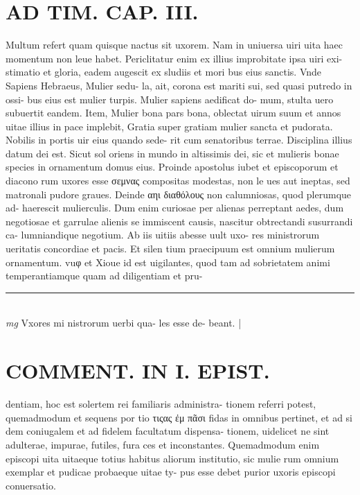 \documentclass{article}
\begin{document}
\begin{pages}
\section*{AD TIM. CAP. III. }
\marginpar{[ p.132 ]}\pstart Multum refert quam quisque nactus sit uxorem. Nam in uniuersa uiri uita haec momentum non leue habet. Periclitatur enim ex illius improbitate ipsa uiri exi- stimatio et gloria, eadem augescit ex sludiis et mori bus eius sanctis. Vnde Sapiens Hebraeus, Mulier sedu- la, ait, corona est mariti sui, sed quasi putredo in ossi- bus eius est mulier turpis. Mulier sapiens aedificat do- mum, stulta uero subuertit eandem. Item, Mulier bona pars bona, oblectat uirum suum et annos uitae illius in pace implebit, Gratia super gratiam mulier sancta et pudorata. Nobilis in portis uir eius quando sede- rit cum senatoribus terrae. Disciplina illius datum dei est. Sicut sol oriens in mundo in altissimis dei, sic et mulieris bonae species in ornamentum domus eius. Proinde apostolus iubet et episcoporum et diacono rum uxores esse σεμνας compositas modestas, non le ues aut ineptas, sed matronali pudore graues. Deinde αηι διαθόλους non calumniosas, quod plerumque ad- haerescit mulierculis. Dum enim curiosae per alienas perreptant aedes, dum negotiosae et garrulae alienis se immiscent causis, nascitur obtrectandi susurrandi ca- lumniandique negotium. Ab iis uitiis abesse uult uxo- res ministrorum ueritatis concordiae et pacis. Et silen tium praecipuum est omnium mulierum ornamentum. vuφ et Xioue id est uigilantes, quod tam ad sobrietatem animi temperantiamque quam ad diligentiam et pru-  \pend
\vspace{0.5cm}\noindent
\vspace{0.2cm}\rule{1cm}{0.2pt}\\ 
\hspace{0.2cm}\textit{mg}
\footnotesize Vxores mi nistrorum uerbi qua- les esse de- beant. 
\normalsize| 
\section*{COMMENT. IN I. EPIST. }\pstart dentiam, hoc est solertem rei familiaris administra- tionem referri potest, quemadmodum et sequens por tio τιςας ἐμ πᾶσι fidas in omnibus pertinet, et ad si dem coniugalem et ad fidelem facultatum dispensa- tionem, uidelicet ne sint adulterae, impurae, futiles, fura ces et inconstantes. Quemadmodum enim episcopi uita uitaeque totius habitus aliorum institutio, sic mulie rum omnium exemplar et pudicae probaeque uitae ty- pus esse debet purior uxoris episcopi conuersatio.  \pend
{}
{}

\end{pages}
\end{document}

